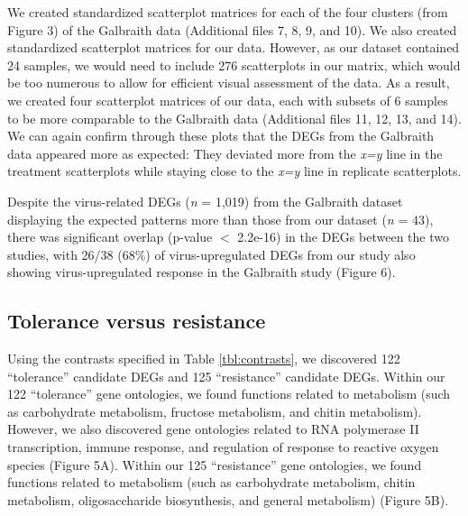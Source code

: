 \documentclass{bmcart}
\begin{document}
\begin{linenumbers}
\begin{doublespacing}
We created standardized scatterplot matrices for each of the four clusters (from Figure 3) of the Galbraith data (Additional files 7, 8, 9, and 10). We also created standardized scatterplot matrices for our data. However, as our dataset contained 24 samples, we would need to include 276 scatterplots in our matrix, which would be too numerous to allow for efficient visual assessment of the data. As a result, we created four scatterplot matrices of our data, each with subsets of 6 samples to be more comparable to the Galbraith data (Additional files 11, 12, 13, and 14). We can again confirm through these plots that the DEGs from the Galbraith data appeared more as expected: They deviated more from the \textit{x=y} line in the treatment scatterplots while staying close to the \textit{x=y} line in replicate scatterplots.

Despite the virus-related DEGs (\textit{n} = 1,019) from the Galbraith dataset displaying the expected patterns more than those from our dataset (\textit{n} = 43), there was significant overlap (p-value $<$ 2.2e-16) in the DEGs between the two studies, with 26/38 (68\%) of virus-upregulated DEGs from our study also showing virus-upregulated response in the Galbraith study (Figure 6).

\subsection*{Tolerance versus resistance}

Using the contrasts specified in Table \ref{tbl:contrasts}, we discovered 122 ``tolerance'' candidate DEGs and 125 ``resistance'' candidate DEGs. Within our 122 ``tolerance'' gene ontologies, we found functions related to metabolism (such as carbohydrate metabolism, fructose metabolism, and chitin metabolism). However, we also discovered gene ontologies related to RNA polymerase II transcription, immune response, and regulation of response to reactive oxygen species (Figure 5A). Within our 125 ``resistance'' gene ontologies, we found functions related to metabolism (such as carbohydrate metabolism, chitin metabolism, oligosaccharide biosynthesis, and general metabolism) (Figure 5B).


\end{doublespacing}
\end{linenumbers}
\end{document}
